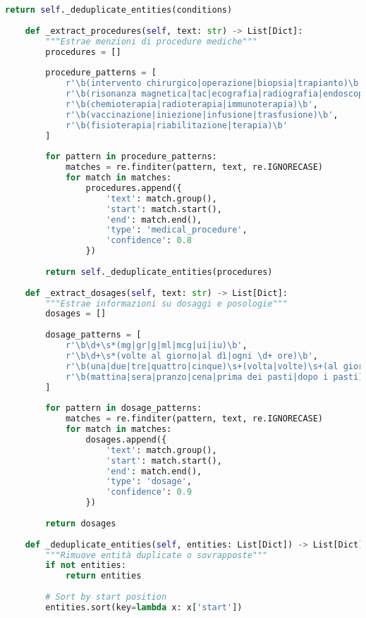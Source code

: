 \documentclass[12pt,a4paper]{report}
\begin{document}
\begin{lstlisting}[language=Python, caption=Medical Entity Extractor]
        return self._deduplicate_entities(conditions)
    
    def _extract_procedures(self, text: str) -> List[Dict]:
        """Estrae menzioni di procedure mediche"""
        procedures = []
        
        procedure_patterns = [
            r'\b(intervento chirurgico|operazione|biopsia|trapianto)\b',
            r'\b(risonanza magnetica|tac|ecografia|radiografia|endoscopia)\b',
            r'\b(chemioterapia|radioterapia|immunoterapia)\b',
            r'\b(vaccinazione|iniezione|infusione|trasfusione)\b',
            r'\b(fisioterapia|riabilitazione|terapia)\b'
        ]
        
        for pattern in procedure_patterns:
            matches = re.finditer(pattern, text, re.IGNORECASE)
            for match in matches:
                procedures.append({
                    'text': match.group(),
                    'start': match.start(),
                    'end': match.end(),
                    'type': 'medical_procedure',
                    'confidence': 0.8
                })
        
        return self._deduplicate_entities(procedures)
    
    def _extract_dosages(self, text: str) -> List[Dict]:
        """Estrae informazioni su dosaggi e posologie"""
        dosages = []
        
        dosage_patterns = [
            r'\b\d+\s*(mg|gr|g|ml|mcg|ui|iu)\b',
            r'\b\d+\s*(volte al giorno|al dì|ogni \d+ ore)\b',
            r'\b(una|due|tre|quattro|cinque)\s+(volta|volte)\s+(al giorno|al dì)\b',
            r'\b(mattina|sera|pranzo|cena|prima dei pasti|dopo i pasti)\b'
        ]
        
        for pattern in dosage_patterns:
            matches = re.finditer(pattern, text, re.IGNORECASE)
            for match in matches:
                dosages.append({
                    'text': match.group(),
                    'start': match.start(),
                    'end': match.end(),
                    'type': 'dosage',
                    'confidence': 0.9
                })
        
        return dosages
    
    def _deduplicate_entities(self, entities: List[Dict]) -> List[Dict]:
        """Rimuove entità duplicate o sovrapposte"""
        if not entities:
            return entities
        
        # Sort by start position
        entities.sort(key=lambda x: x['start'])
        

\end{lstlisting}
\end{document}
